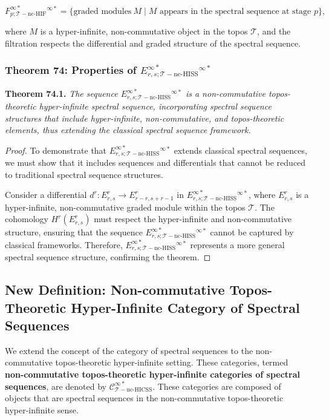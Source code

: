 \documentclass{article}
\begin{document}
\[
F^{\infty *}_{p; \mathcal{T}-\text{nc-HIF}}^{\infty *} = \{ \text{graded modules} \ M \mid M \text{ appears in the spectral sequence at stage } p\},
\]

where \(M\) is a hyper-infinite, non-commutative object in the topos \(\mathcal{T}\), and the filtration respects the differential and graded structure of the spectral sequence.

\subsubsection{Theorem 74: Properties of \(E^{\infty *}_{r, s; \mathcal{T}-\text{nc-HISS}}^{\infty *}\)}
\textbf{Theorem 74.1.} \textit{The sequence \(E^{\infty *}_{r, s; \mathcal{T}-\text{nc-HISS}}^{\infty *}\) is a non-commutative topos-theoretic hyper-infinite spectral sequence, incorporating spectral sequence structures that include hyper-infinite, non-commutative, and topos-theoretic elements, thus extending the classical spectral sequence framework.}

\begin{proof}
To demonstrate that \(E^{\infty *}_{r, s; \mathcal{T}-\text{nc-HISS}}^{\infty *}\) extends classical spectral sequences, we must show that it includes sequences and differentials that cannot be reduced to traditional spectral sequence structures.

Consider a differential \(d^r: E^{r}_{r, s} \to E^{r}_{r-r, s+r-1}\) in \(E^{\infty *}_{r, s; \mathcal{T}-\text{nc-HISS}}^{\infty *}\), where \(E^{r}_{r, s}\) is a hyper-infinite, non-commutative graded module within the topos \(\mathcal{T}\). The cohomology \(H^r(E^{r}_{r, s})\) must respect the hyper-infinite and non-commutative structure, ensuring that the sequence \(E^{\infty *}_{r, s; \mathcal{T}-\text{nc-HISS}}^{\infty *}\) cannot be captured by classical frameworks. Therefore, \(E^{\infty *}_{r, s; \mathcal{T}-\text{nc-HISS}}^{\infty *}\) represents a more general spectral sequence structure, confirming the theorem.
\end{proof}

\subsection{New Definition: Non-commutative Topos-Theoretic Hyper-Infinite Category of Spectral Sequences}
We extend the concept of the category of spectral sequences to the non-commutative topos-theoretic hyper-infinite setting. These categories, termed \textbf{non-commutative topos-theoretic hyper-infinite categories of spectral sequences}, are denoted by \(\mathcal{C}_{\mathcal{T}-\text{nc-HICSS}}^{\infty *}\). These categories are composed of objects that are spectral sequences in the non-commutative topos-theoretic hyper-infinite sense.
\end{document}
